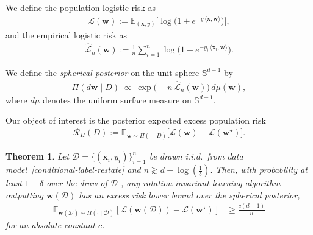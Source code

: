 \documentclass{article}
\theoremstyle{plain}
\newtheorem{theorem}{Theorem}[section]
\theoremstyle{definition}
\theoremstyle{remark}
\begin{document}
{We define the population logistic risk as
\begin{align}
\mathcal{L}(\mathbf{w})
:= \mathbb{E}_{(\mathbf{x},y)}
\Big[
\log\!\big(1 + e^{-y\,\langle \mathbf{x}, \mathbf{w} \rangle}\big)
\Big],
\end{align}
and the empirical logistic risk as
\begin{align}
\widehat{\mathcal{L}}_n(\mathbf{w})
:= \frac{1}{n}\sum_{i=1}^n
\log\!\big(1 + e^{-y_i\,\langle \mathbf{x}_i, \mathbf{w} \rangle}\big).
\end{align}

We define the \emph{spherical posterior} on the unit sphere $\mathbb{S}^{d-1}$ by
\begin{align}
\Pi(d\mathbf{w} \mid D)
\;\propto\;
\exp\!\big(- n\, \widehat{\mathcal{L}}_n(\mathbf{w})\big)\,
d\mu(\mathbf{w}),
\end{align}
where $d\mu$ denotes the uniform surface measure on $\mathbb{S}^{d-1}$.

Our object of interest is the posterior expected excess population risk
\begin{align}
\mathcal{R}_{\Pi}(D)
:= \mathbb{E}_{\mathbf{w} \sim \Pi(\cdot \mid D)}
\Big[
\mathcal{L}(\mathbf{w}) - \mathcal{L}(\mathbf{w}^\star)
\Big].
\end{align}




\begin{theorem}
\label{main-theorem-restate}
Let $\mathcal{D} = \{(\mathbf{x}_i,y_i)\}_{i=1}^n$
be drawn i.i.d.\ from data model~\eqref{conditional-label-restate} and $n \gtrsim d +\log(\frac{1}{\delta})$. Then, with probability at least $1-\delta$ over the draw of $\mathcal{D}$ , any rotation-invariant learning algorithm outputting $\mathbf{w}(\mathcal{D})$ has an excess risk lower bound over the spherical posterior,
\begin{align}
\mathbb E_{\boldsymbol w(\mathcal{D})\sim \Pi(\cdot\mid \mathcal{D})} \left[\mathcal{L}(\mathbf{w}(\mathcal{D})) - \mathcal{L}(\mathbf{w}^{\star})\right]
&\ge
\frac{c (d-1)}{n}
\end{align}
for an absolute constant $c$.
\end{theorem}

}
\end{document}
